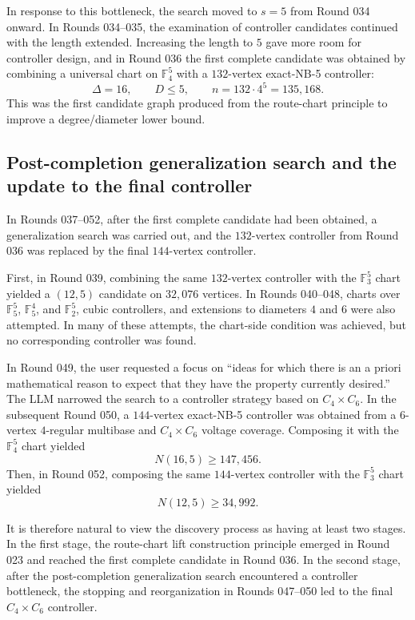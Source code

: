 \documentclass[11pt]{article}
\theoremstyle{definition}
\theoremstyle{remark}
\renewcommand{\_}{\textunderscore\allowbreak}
\begin{document}
In response to this bottleneck, the search moved to \(s=5\) from Round
034 onward. In Rounds 034--035, the examination of controller candidates
continued with the length extended. Increasing the length to \(5\) gave
more room for controller design, and in Round 036 the first complete
candidate was obtained by combining a universal chart on
\(\mathbb F_4^5\) with a \(132\)-vertex exact-NB-5 controller: \[
  \Delta=16,
  \qquad
  D\le5,
  \qquad
  n=132\cdot4^5=135{,}168 .
\] This was the first candidate graph produced from the route-chart
principle to improve a degree/diameter lower bound.

\subsection{Post-completion generalization search and the update to
the final
controller}\label{post-completion-generalization-search-and-the-update-to-the-final-controller}

In Rounds 037--052, after the first complete candidate had been
obtained, a generalization search was carried out, and the
\(132\)-vertex controller from Round 036 was replaced by the final
\(144\)-vertex controller.

First, in Round 039, combining the same \(132\)-vertex controller with
the \(\mathbb F_3^5\) chart yielded a \((12,5)\) candidate on
\(32{,}076\) vertices. In Rounds 040--048, charts over
\(\mathbb F_5^5\), \(\mathbb F_5^4\), and \(\mathbb F_2^5\), cubic
controllers, and extensions to diameters \(4\) and \(6\) were also
attempted. In many of these attempts, the chart-side condition was
achieved, but no corresponding controller was found.

In Round 049, the user requested a focus on ``ideas for which there is
an a priori mathematical reason to expect that they have the property
currently desired.'' The LLM narrowed the search to a controller
strategy based on \(C_4\times C_6\). In the subsequent Round 050, a
\(144\)-vertex exact-NB-5 controller was obtained from a \(6\)-vertex
\(4\)-regular multibase and \(C_4\times C_6\) voltage coverage.
Composing it with the \(\mathbb F_4^5\) chart yielded \[
  N(16,5)\ge147{,}456 .
\] Then, in Round 052, composing the same \(144\)-vertex controller with
the \(\mathbb F_3^5\) chart yielded \[
  N(12,5)\ge34{,}992 .
\]

It is therefore natural to view the discovery process as having at least
two stages. In the first stage, the route-chart lift construction
principle emerged in Round 023 and reached the first complete candidate
in Round 036. In the second stage, after the post-completion
generalization search encountered a controller bottleneck, the stopping
and reorganization in Rounds 047--050 led to the final \(C_4\times C_6\)
controller.
\end{document}
